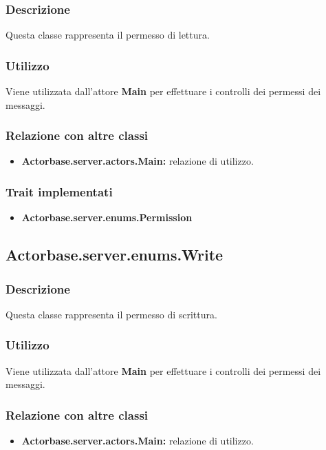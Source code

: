 \documentclass[a4paper]{article}
\begin{document}
			\subsubsection{Descrizione}
				Questa classe rappresenta il permesso di lettura.
				
			\subsubsection{Utilizzo}
				Viene utilizzata dall'attore \textbf{Main} per effettuare i controlli dei permessi dei messaggi. 
				
			\subsubsection{Relazione con altre classi}
				\begin{itemize}
					\item \textbf{Actorbase.server.actors.Main:} relazione di utilizzo.
				\end{itemize}
						
			\subsubsection{Trait implementati}
				\begin{itemize}
					\item \textbf{Actorbase.server.enums.Permission} 
				\end{itemize}
				
		\subsection{Actorbase.server.enums.Write}
			\subsubsection{Descrizione}
				Questa classe rappresenta il permesso di scrittura.
				
			\subsubsection{Utilizzo}
				Viene utilizzata dall'attore \textbf{Main} per effettuare i controlli dei permessi dei messaggi. 
				
			\subsubsection{Relazione con altre classi}
				\begin{itemize}
					\item \textbf{Actorbase.server.actors.Main:} relazione di utilizzo.
				\end{itemize}
				
\end{document}
